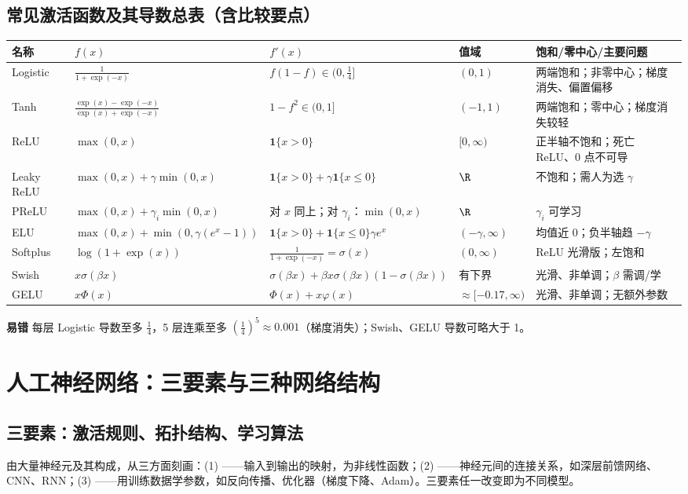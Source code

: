 \subsection{常见激活函数及其导数总表（含比较要点）}\label{sec:D03a-acttab}
\begin{center}\small\renewcommand{\arraystretch}{1.2}
\begin{tabularx}{\linewidth}{@{}p{1.55cm}p{4.0cm}p{4.3cm}p{1.55cm}L@{}}
\toprule
名称 & $f(x)$ & $f'(x)$ & 值域 & 饱和/零中心/主要问题 \\
\midrule
Logistic & $\frac1{1+\exp(-x)}$ & $f(1-f)\in(0,\frac14]$ & $(0,1)$ & 两端饱和；非零中心；梯度消失、偏置偏移 \\
Tanh & $\frac{\exp(x)-\exp(-x)}{\exp(x)+\exp(-x)}$ & $1-f^2\in(0,1]$ & $(-1,1)$ & 两端饱和；零中心；梯度消失较轻 \\
ReLU & $\max(0,x)$ & $\mathbf 1\{x>0\}$ & $[0,\infty)$ & 正半轴不饱和；死亡 ReLU、0 点不可导 \\
Leaky ReLU & $\max(0,x)+\gamma\min(0,x)$ & $\mathbf 1\{x>0\}+\gamma\mathbf 1\{x\le0\}$ & $\R$ & 不饱和；需人为选 $\gamma$ \\
PReLU & $\max(0,x)+\gamma_i\min(0,x)$ & 对 $x$ 同上；对 $\gamma_i$：$\min(0,x)$ & $\R$ & $\gamma_i$ 可学习 \\
ELU & $\max(0,x)+\min(0,\gamma(e^x-1))$ & $\mathbf 1\{x>0\}+\mathbf 1\{x\le0\}\gamma e^x$ & $(-\gamma,\infty)$ & 均值近 0；负半轴趋 $-\gamma$ \\
Softplus & $\log(1+\exp(x))$ & $\frac1{1+\exp(-x)}=\sigma(x)$ & $(0,\infty)$ & ReLU 光滑版；左饱和 \\
Swish & $x\sigma(\beta x)$ & $\sigma(\beta x)+\beta x\sigma(\beta x)(1-\sigma(\beta x))$ & 有下界 & 光滑、非单调；$\beta$ 需调/学 \\
GELU & $x\Phi(x)$ & $\Phi(x)+x\varphi(x)$ & $\approx[-0.17,\infty)$ & 光滑、非单调；无额外参数 \\
\bottomrule
\end{tabularx}
\end{center}
\textbf{易错} 每层 Logistic 导数至多 $\frac14$，5 层连乘至多 $(\frac14)^5\approx0.001$（梯度消失）；Swish、GELU 导数可略大于 1。

\section{人工神经网络：三要素与三种网络结构}

\subsection{三要素：激活规则、拓扑结构、学习算法}
由大量神经元及其构成，从三方面刻画：(1) ——输入到输出的映射，为非线性函数；(2) ——神经元间的连接关系，如深层前馈网络、CNN、RNN；(3) ——用训练数据学参数，如反向传播、优化器（梯度下降、Adam）。三要素任一改变即为不同模型。

